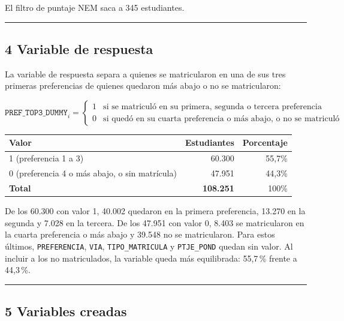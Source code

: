 \documentclass[11pt]{article}
\begin{document}
El filtro de puntaje NEM saca a 345 estudiantes.

\medskip\hrule\medskip

\subsection*{4 \; Variable de respuesta}

La variable de respuesta separa a quienes se matricularon en una de sus
tres primeras preferencias de quienes quedaron más abajo o no se
matricularon:

\[
\texttt{PREF\_TOP3\_DUMMY}_i =
\begin{cases}
1 & \text{si se matriculó en su primera, segunda o tercera preferencia} \\[4pt]
0 & \text{si quedó en su cuarta preferencia o más abajo, o no se matriculó}
\end{cases}
\]

\begin{center}
\begin{tabular}{lrr}
\toprule
\textbf{Valor} & \textbf{Estudiantes} & \textbf{Porcentaje} \\
\midrule
1 (preferencia 1 a 3)                          & 60.300 & 55,7\% \\
0 (preferencia 4 o más abajo, o sin matrícula) & 47.951 & 44,3\% \\
\midrule
\textbf{Total} & \textbf{108.251} & 100\% \\
\bottomrule
\end{tabular}
\end{center}

De los 60.300 con valor 1, 40.002 quedaron en la primera preferencia,
13.270 en la segunda y 7.028 en la tercera. De los 47.951 con valor 0,
8.403 se matricularon en la cuarta preferencia o más abajo y 39.548 no
se matricularon. Para estos últimos, \texttt{PREFERENCIA}, \texttt{VIA},
\texttt{TIPO\_MATRICULA} y \texttt{PTJE\_POND} quedan sin valor. Al
incluir a los no matriculados, la variable queda más equilibrada: 55,7\,\%
frente a 44,3\,\%.

\medskip\hrule\medskip

\subsection*{5 \; Variables creadas}
\end{document}
